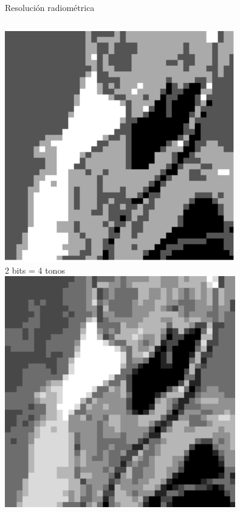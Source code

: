 \documentclass{beamer}
\begin{document}
\begin{frame}{Resolución radiométrica}
	\begin{columns}
		\includegraphics[width=1\textwidth]{IMGs/res_rad2}\\
		2 bits = 4 tonos
		\includegraphics[width=1\textwidth]{IMGs/res_rad3}\\

\end{columns}
\end{frame}
\end{document}
